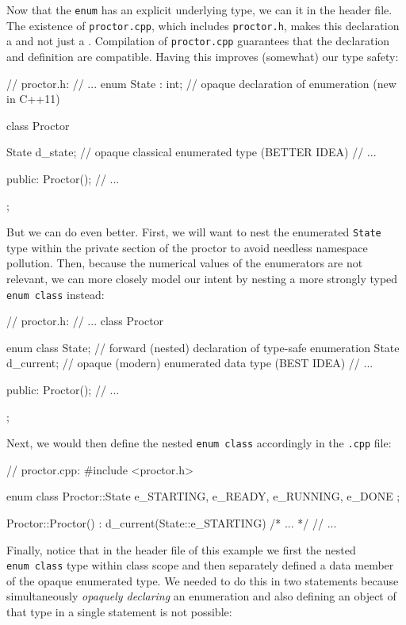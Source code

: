 \noindent Now that the  \lstinline!enum! has an explicit
underlying type, we can  it in the header file.
The existence of \lstinline!proctor.cpp!, which includes
\lstinline!proctor.h!, makes this declaration a 
and not just a . Compilation of
\lstinline!proctor.cpp! guarantees that the declaration and definition are
compatible. Having this  improves (somewhat)
our type safety:

\begin{emcppslisting}[emcppsbatch=e4]
// proctor.h:
// ...
enum State : int;  // opaque declaration of enumeration (new in C++11)

class Proctor
{
    State d_state;  // opaque classical enumerated type (BETTER IDEA)
    // ...

public:
    Proctor();
    // ...
};
\end{emcppslisting}

\noindent But we can do even better. First, we will want to nest the enumerated
\lstinline!State! type within the private section of the proctor to avoid
needless namespace pollution. Then, because the numerical values
of the enumerators are not relevant, we can more closely model our
intent by nesting a more strongly typed \lstinline!enum!~\lstinline!class! instead:

\begin{emcppslisting}[emcppsbatch=e5]
// proctor.h:
// ...
class Proctor
{
    enum class State;  // forward (nested) declaration of type-safe enumeration
    State d_current;   // opaque (modern) enumerated data type (BEST IDEA)
    // ...

public:
    Proctor();
    // ...
};
\end{emcppslisting}

\noindent Next, we would then define the nested
\lstinline!enum!~\lstinline!class! %
accordingly in the
\lstinline!.cpp! file:

\begin{emcppslisting}[emcppsbatch=e5]
// proctor.cpp:
#include <proctor.h>

enum class Proctor::State { e_STARTING, e_READY, e_RUNNING, e_DONE };

Proctor::Proctor() : d_current(State::e_STARTING) { /* ... */ }
// ...
\end{emcppslisting}

\noindent Finally, notice that in the header file of this example we first 
the nested \lstinline!enum!~\lstinline!class! type within class scope and
then separately defined a data member of the opaque
enumerated type. We needed to do this in two statements because
simultaneously \emph{opaquely declaring} an enumeration
and also defining an object
of that type in a single statement is not possible:

